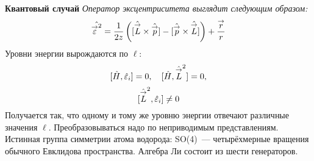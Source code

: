 \textbf{Квантовый случай}
\emph{Оператор эксцентриситета выглядит следующим образом:}
$$
    \Hat{\overset{\to}{\varepsilon}^2} = \dfrac{1}{2z} \left(
        [\Hat{\overset{\to}{L}} \times \Hat{\overset{\to}{p}}]
        -
        [\Hat{\overset{\to}{p}} \times \Hat{\overset{\to}{L}} ]
    \right) + \dfrac{\overset{\to}{r}}{r}
$$
Уровни энергии вырождаются по $\ell$:
$$
    [\Hat H, \Hat {\varepsilon}_i] = 0, \quad [\Hat H, \Hat{\overset{\to}{L}}^2] = 0,
$$
$$
    [\Hat{\overset{\to}{L}}^2, \Hat {\varepsilon}_i] \neq 0
$$
Получается так, что одному и тому же уровню энергии отвечают различные значения $\ell$. Преобразовываться надо по неприводимым представлениям.  Истинная группа симметрии атома водорода: SO(4)~--- четырёхмерные вращения обычного Евклидова пространства. Алгебра Ли состоит из шести генераторов. 